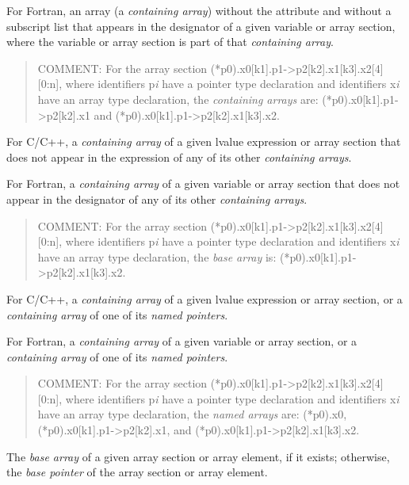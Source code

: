 For Fortran, an array (a \emph{containing array}) without the 
attribute and without a subscript list that appears in the designator of a
given variable or array section, where the variable or array section is part
of that \emph{containing array}.

\begin{quote}
COMMENT: For the array section (*p0).x0[k1].p1->p2[k2].x1[k3].x2[4][0:n],
where identifiers p\emph{i} have a pointer type declaration
and identifiers x\emph{i} have an array type declaration, 
the \emph{containing arrays} are:
    (*p0).x0[k1].p1->p2[k2].x1
and 
(*p0).x0[k1].p1->p2[k2].x1[k3].x2.
\end{quote}
\glossarydefend

\glossarydefstart
For C/C++, a \emph{containing array} of a given lvalue expression or 
array section that does not appear in the expression of any of its 
other \emph{containing arrays}.

For Fortran, a \emph{containing array} of a given variable or array section
that does not appear in the designator of any of its other 
\emph{containing arrays}.

\begin{quote}
COMMENT: For the array section (*p0).x0[k1].p1->p2[k2].x1[k3].x2[4][0:n],
where identifiers p\emph{i} have a pointer type declaration
and identifiers x\emph{i} have an array type declaration, 
the \emph{base array} is: (*p0).x0[k1].p1->p2[k2].x1[k3].x2.
\end{quote}
\glossarydefend

\glossarydefstart
For C/C++, a \emph{containing array} of a given lvalue expression or array 
section, or a \emph{containing array} of one of its \emph{named pointers}.

For Fortran, a \emph{containing array} of a given variable or array section, or
a \emph{containing array} of one of its \emph{named pointers}.

\begin{quote}
COMMENT: For the array section (*p0).x0[k1].p1->p2[k2].x1[k3].x2[4][0:n],
where identifiers p\emph{i} have a pointer type declaration
and identifiers x\emph{i} have an array type declaration, 
the \emph{named arrays} are:
(*p0).x0,
    (*p0).x0[k1].p1->p2[k2].x1,
and 
(*p0).x0[k1].p1->p2[k2].x1[k3].x2.
\end{quote}

\glossarydefend

\glossarydefstart
The \emph{base array} of a given array section or array element, if
it exists; otherwise, the \emph{base pointer} of the array section or array
element.

